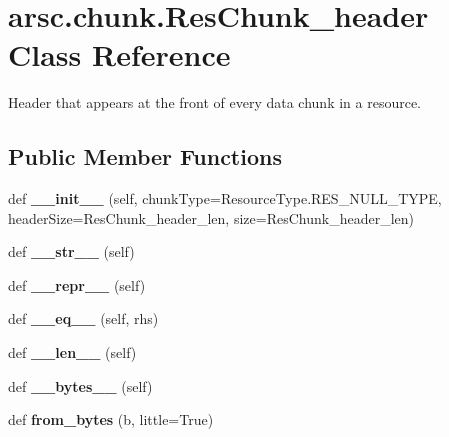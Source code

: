 \hypertarget{classarsc_1_1chunk_1_1ResChunk__header}{}\section{arsc.\+chunk.\+Res\+Chunk\+\_\+header Class Reference}
\label{classarsc_1_1chunk_1_1ResChunk__header}


Header that appears at the front of every data chunk in a resource.  


\subsection*{Public Member Functions}
\begin{DoxyCompactItemize}
\item 
\mbox{\label{classarsc_1_1chunk_1_1ResChunk__header_a2058bbcf356ca56b29153ff9a065abc6}} 
def {\bfseries \+\_\+\+\_\+init\+\_\+\+\_\+} (self, chunk\+Type=Resource\+Type.\+R\+E\+S\+\_\+\+N\+U\+L\+L\+\_\+\+T\+Y\+PE, header\+Size=Res\+Chunk\+\_\+header\+\_\+len, size=Res\+Chunk\+\_\+header\+\_\+len)
\item 
\mbox{\label{classarsc_1_1chunk_1_1ResChunk__header_a34d6403d6edce7fb369b3d6933c27dee}} 
def {\bfseries \+\_\+\+\_\+str\+\_\+\+\_\+} (self)
\item 
\mbox{\label{classarsc_1_1chunk_1_1ResChunk__header_a7a5f16c8263a193898e7ed2619a4082c}} 
def {\bfseries \+\_\+\+\_\+repr\+\_\+\+\_\+} (self)
\item 
\mbox{\label{classarsc_1_1chunk_1_1ResChunk__header_ab148b08c983975777f31ed8bb958b74e}} 
def {\bfseries \+\_\+\+\_\+eq\+\_\+\+\_\+} (self, rhs)
\item 
\mbox{\label{classarsc_1_1chunk_1_1ResChunk__header_a3a0104e929b75484360f38bcf68cff38}} 
def {\bfseries \+\_\+\+\_\+len\+\_\+\+\_\+} (self)
\item 
\mbox{\label{classarsc_1_1chunk_1_1ResChunk__header_ab8196245262c3ef25430ee683ea1f26d}} 
def {\bfseries \+\_\+\+\_\+bytes\+\_\+\+\_\+} (self)
\item 
\mbox{\label{classarsc_1_1chunk_1_1ResChunk__header_abd99a20cd5e78716a2655867787c0672}} 
def {\bfseries from\+\_\+bytes} (b, little=True)
\end{DoxyCompactItemize}
